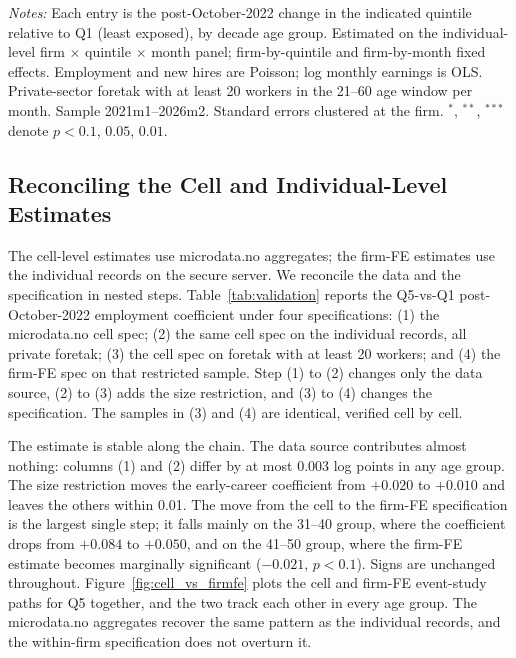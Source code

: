 \documentclass[12pt]{article}
\begin{document}
\begin{table}[tp]
  \centering
  \caption{Within-firm difference-in-differences by AI-exposure quintile, private sector.}
  \label{tab:did_firmfe}
  
  \begin{minipage}{\textwidth}\footnotesize\textit{Notes:} Each entry is the post-October-2022 change in the indicated quintile relative to Q1 (least exposed), by decade age group. Estimated on the individual-level firm $\times$ quintile $\times$ month panel; firm-by-quintile and firm-by-month fixed effects. Employment and new hires are Poisson; log monthly earnings is OLS. Private-sector foretak with at least 20 workers in the 21--60 age window per month. Sample 2021m1--2026m2. Standard errors clustered at the firm. $^{*}$, $^{**}$, $^{***}$ denote $p<0.1$, $0.05$, $0.01$.\end{minipage}
\end{table}


\subsection{Reconciling the Cell and Individual-Level Estimates}\label{sec:results:reconcile}

The cell-level estimates use microdata.no aggregates; the firm-FE estimates use the individual records on the secure server. We reconcile the data and the specification in nested steps. Table~\ref{tab:validation} reports the Q5-vs-Q1 post-October-2022 employment coefficient under four specifications: (1) the microdata.no cell spec; (2) the same cell spec on the individual records, all private foretak; (3) the cell spec on foretak with at least 20 workers; and (4) the firm-FE spec on that restricted sample. Step (1) to (2) changes only the data source, (2) to (3) adds the size restriction, and (3) to (4) changes the specification. The samples in (3) and (4) are identical, verified cell by cell.

The estimate is stable along the chain. The data source contributes almost nothing: columns (1) and (2) differ by at most 0.003 log points in any age group. The size restriction moves the early-career coefficient from $+0.020$ to $+0.010$ and leaves the others within 0.01. The move from the cell to the firm-FE specification is the largest single step; it falls mainly on the 31--40 group, where the coefficient drops from $+0.084$ to $+0.050$, and on the 41--50 group, where the firm-FE estimate becomes marginally significant ($-0.021$, $p<0.1$). Signs are unchanged throughout. Figure~\ref{fig:cell_vs_firmfe} plots the cell and firm-FE event-study paths for Q5 together, and the two track each other in every age group. The microdata.no aggregates recover the same pattern as the individual records, and the within-firm specification does not overturn it.
\end{document}
